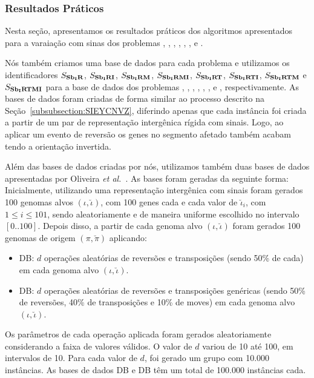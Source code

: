 \subsubsection{Resultados Práticos}

Nesta seção, apresentamos os resultados práticos dos algoritmos apresentados para a varaiação com sinas dos problemas \SbIR{}, \SbIRI{}, \SbIRM{}, \SbIRMI{}, \SbIRT{}, \SbIRTI{}, \SbIRTM{} e \SbIRTMI{}.

Nós também criamos uma base de dados para cada problema e utilizamos os identificadores $S_{\textbf{Sb\textsubscript{I}R}}{}$, $S_{\textbf{Sb\textsubscript{I}RI}}{}$, $S_{\textbf{Sb\textsubscript{I}RM}}{}$, $S_{\textbf{Sb\textsubscript{I}RMI}}{}$, $S_{\textbf{Sb\textsubscript{I}RT}}{}$, $S_{\textbf{Sb\textsubscript{I}RTI}}{}$, $S_{\textbf{Sb\textsubscript{I}RTM}}{}$ e $S_{\textbf{Sb\textsubscript{I}RTMI}}{}$ para a base de dados dos problemas \SbIR{}, \SbIRI{}, \SbIRM{}, \SbIRMI{}, \SbIRT{}, \SbIRTI{}, \SbIRTM{} e \SbIRTMI{}, respectivamente. As bases de dados foram criadas de forma similar ao processo descrito na Seção~\ref{subsubsection:SIEYCNVZ}, diferindo apenas que cada instância foi criada a partir de um par de representação intergênica rígida com sinais. Logo, ao aplicar um evento de reversão os genes no segmento afetado também acabam tendo a orientação invertida.

Além das bases de dados criadas por nós, utilizamos também duas bases de dados apresentadas por Oliveira \textit{et al.}~\cite{2021a-oliveira-etal}. As bases foram geradas da seguinte forma: Inicialmente, utilizando uma representação  intergênica com sinais foram gerados 100 genomas alvos $(\iota,\breve\iota)$, com 100 genes cada e cada valor de $\breve\iota_i$, com $1 \le i \le 101$, sendo aleatoriamente e de maneira uniforme escolhido no intervalo $[0..100]$. Depois disso, a partir de cada genoma alvo $(\iota,\breve\iota)$ foram gerados 100 genomas de origem $(\pi,\breve\pi)$ aplicando:

\begin{itemize}
    \item DB\textsubscript{\SbIRT{}}: $d$ operações aleatórias de reversões e transposições (sendo 50\% de cada) em cada genoma alvo $(\iota,\breve\iota)$.
    \item DB\textsubscript{\SbIRTM{}}: $d$ operações aleatórias de reversões e transposições genéricas (sendo 50\% de reversões, 40\% de transposições e 10\% de moves) em cada genoma alvo $(\iota,\breve\iota)$.
\end{itemize}

Os parâmetros de cada operação aplicada foram gerados aleatoriamente considerando a faixa de valores válidos. O valor de $d$ variou de 10 até 100, em intervalos de 10. Para cada valor de $d$, foi gerado um grupo com 10.000 instâncias. As bases de dados DB\textsubscript{\SbIRT{}} e DB\textsubscript{\SbIRTM{}} têm um total de 100.000 instâncias cada.


